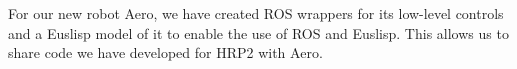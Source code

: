 \documentclass{standalone}
\begin{document}
For our new robot Aero, we have created ROS wrappers for its low-level controls and a Euslisp model of it to enable the use of ROS and Euslisp. This allows us to share code we have developed for HRP2 with Aero. 
\end{document}
